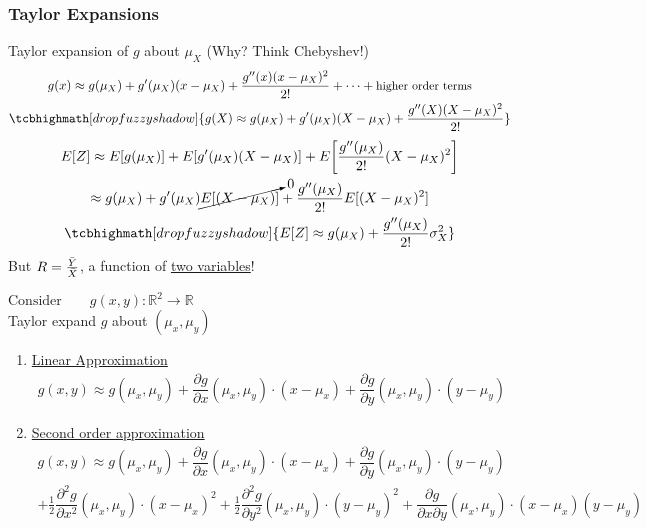 \subsubsection*{Taylor Expansions}
Taylor expansion of $g$ about $\mu_X$ (Why? Think Chebyshev!)
\begin{gather*}
	g(x) \approx g(\mu_X) + g'(\mu_X) (x - \mu_X) + \frac{g''(x)(x - \mu_X)^2}{2!} + \cdots + \text{\small higher order terms}\\
	\tcbhighmath[drop fuzzy shadow]{g(X) \approx g(\mu_X) + g'(\mu_X) (X - \mu_X) + \frac{g''(X)(X - \mu_X)^2}{2!}}
\end{gather*}
\begin{gather*}
	E[Z] \approx E[g(\mu_X)] + E[g'(\mu_X)(X - \mu_X)] + E\bigg[\frac{g''(\mu_X)}{2!} (X - \mu_X)^2 \bigg]\\
	\approx g(\mu_X) + g'(\mu_X) \cancelto{0}{E[(X - \mu_X)]} + \frac{g''(\mu_X)}{2!} E[ (X - \mu_X)^2]\\
	\tcbhighmath[drop fuzzy shadow]{E[Z] \approx g(\mu_X) + \frac{g''(\mu_X)}{2!} \sigma^2_X}
\end{gather*}
But $R = \frac{\bar{Y}}{\bar{X}}$, a function of \underline{two variables}!
\begin{center}
	$\text{Consider} \qquad g(x,y) : \mathbb{R}^2 \rightarrow \mathbb{R}$\\
	Taylor expand $g$ about $(\mu_x, \mu_y)$
\end{center}
\begin{enumerate}[label=\protect\circled{\arabic*}]
	\item \underline{Linear Approximation}
	\begin{gather*}
		g(x,y) \approx g(\mu_x, \mu_y) + \dfrac{\partial g}{\partial x}(\mu_x, \mu_y) \cdot (x - \mu_x) + \dfrac{\partial g}{\partial y}(\mu_x, \mu_y) \cdot (y - \mu_y)
	\end{gather*}
	\item \underline{Second order approximation}
	\begin{gather*}
		g(x,y) \approx g(\mu_x, \mu_y) + \dfrac{\partial g}{\partial x}(\mu_x, \mu_y) \cdot (x - \mu_x) + \dfrac{\partial g}{\partial y}(\mu_x, \mu_y) \cdot (y - \mu_y)\\
		+ \frac{1}{2} \dfrac{\partial^2 g}{\partial x^2}(\mu_x, \mu_y) \cdot (x - \mu_x)^2 + \frac{1}{2} \dfrac{\partial^2 g}{\partial y^2}(\mu_x, \mu_y) \cdot (y - \mu_y)^2 + \dfrac{\partial g}{\partial x \partial y}(\mu_x, \mu_y) \cdot (x - \mu_x) (y - \mu_y) 
	\end{gather*}
\end{enumerate}
